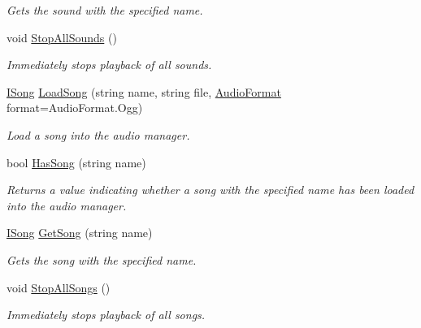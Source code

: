 \begin{DoxyCompactItemize}
\begin{DoxyCompactList}\small\item\em Gets the sound with the specified name. \end{DoxyCompactList}\item 
void \hyperlink{class_tri_devs_1_1_tri_engine_1_1_audio_1_1_audio_manager_ad04c01eef431dfd0d25d7cc76fed0720}{Stop\-All\-Sounds} ()
\begin{DoxyCompactList}\small\item\em Immediately stops playback of all sounds. \end{DoxyCompactList}\item 
\hyperlink{interface_tri_devs_1_1_tri_engine_1_1_audio_1_1_i_song}{I\-Song} \hyperlink{class_tri_devs_1_1_tri_engine_1_1_audio_1_1_audio_manager_a4e3e640920b01ea47e61b2228f5f516c}{Load\-Song} (string name, string file, \hyperlink{namespace_tri_devs_1_1_tri_engine_1_1_audio_a3e1817498a8306afd084903a967537ef}{Audio\-Format} format=Audio\-Format.\-Ogg)
\begin{DoxyCompactList}\small\item\em Load a song into the audio manager. \end{DoxyCompactList}\item 
bool \hyperlink{class_tri_devs_1_1_tri_engine_1_1_audio_1_1_audio_manager_a4718af183f587de26d9fb4babeb22ff0}{Has\-Song} (string name)
\begin{DoxyCompactList}\small\item\em Returns a value indicating whether a song with the specified name has been loaded into the audio manager. \end{DoxyCompactList}\item 
\hyperlink{interface_tri_devs_1_1_tri_engine_1_1_audio_1_1_i_song}{I\-Song} \hyperlink{class_tri_devs_1_1_tri_engine_1_1_audio_1_1_audio_manager_a5900884ef07947c0af22d317c6f67e0c}{Get\-Song} (string name)
\begin{DoxyCompactList}\small\item\em Gets the song with the specified name. \end{DoxyCompactList}\item 
void \hyperlink{class_tri_devs_1_1_tri_engine_1_1_audio_1_1_audio_manager_a2d7f24c9b059f6b8bee6418973146993}{Stop\-All\-Songs} ()
\begin{DoxyCompactList}\small\item\em Immediately stops playback of all songs. \end{DoxyCompactList}\end{DoxyCompactItemize}



